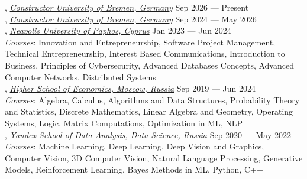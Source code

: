 , \textit{\href{https://constructor.university/}{Constructor University of Bremen, Germany}} \hfill Sep 2026 --- Present \\

, \textit{\href{https://constructor.university/}{Constructor University of Bremen, Germany}} \hfill Sep 2024 --- May 2026 \\

, \textit{\href{https://www.nup.ac.cy/bsc-in-applied-computer-science/}{Neapolis University of Paphos, Cyprus}} \hfill Jan 2023 --- Jun 2024 \\
\textit{Courses}: Innovation and Entrepreneurship, Software Project Management, Technical Entrepreneurship, Interest Based Communications, Introduction to Business, Principles of Cybersecurity, Advanced Databases Concepts, Advanced Computer Networks, Distributed Systems \\

, \textit{\href{https://www.hse.ru/en/ba/ami/}{Higher School of Economics, Moscow, Russia}} \hfill Sep 2019 --- Jun 2024 \\
\textit{Courses}: Algebra, Calculus, Algorithms and Data Structures, Probability Theory and Statistics, Discrete Mathematics, Linear Algebra and Geometry, Operating Systems, Logic, Matrix Computations, Optimization in ML, NLP \\

, \textit{Yandex School of Data Analysis, Data Science, Russia} \hfill Sep 2020 --- May 2022 \\
\textit{Courses}: Machine Learning, Deep Learning, Deep Vision and Graphics, Computer Vision, 3D Computer Vision, Natural Language Processing, Generative Models, Reinforcement Learning, Bayes Methods in ML, Python, C++ \\
